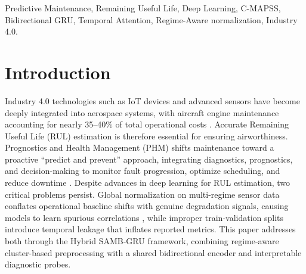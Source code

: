 \documentclass[conference]{IEEEtran}
\begin{document}
\begin{IEEEkeywords}
Predictive Maintenance, Remaining Useful Life, Deep Learning, C-MAPSS, Bidirectional GRU, Temporal Attention, Regime-Aware normalization, Industry 4.0.
\end{IEEEkeywords}

\section{Introduction}

Industry 4.0 technologies such as IoT devices and advanced sensors have become deeply integrated into aerospace systems, with aircraft engine maintenance accounting for nearly 35--40\% of total operational costs \cite{b1}. Accurate Remaining Useful Life (RUL) estimation is therefore essential for ensuring airworthiness. Prognostics and Health Management (PHM) shifts maintenance toward a proactive ``predict and prevent'' approach, integrating diagnostics, prognostics, and decision-making to monitor fault progression, optimize scheduling, and reduce downtime \cite{b2, b3, b4}.
Despite advances in deep learning for RUL estimation, two critical problems persist. Global normalization on multi-regime sensor data conflates operational baseline shifts with genuine degradation signals, causing models to learn spurious correlations \cite{b5}, while improper train-validation splits introduce temporal leakage that inflates reported metrics. This paper addresses both through the Hybrid SAMB-GRU framework, combining regime-aware cluster-based preprocessing with a shared bidirectional encoder and interpretable diagnostic probes.

\end{document}
